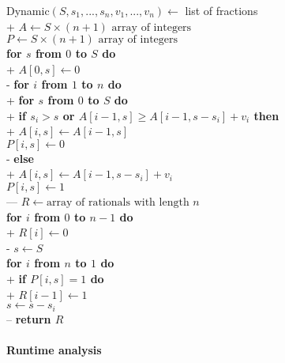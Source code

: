 \documentclass{article}
\begin{document}
\begin{pseudo}
    Dynamic$(S,s_1,...,s_n,v_1,...,v_n)\leftarrow$ list of fractions\\+
        $A\leftarrow S\times (n+1)\text{ array of integers}$\\
        $P\leftarrow S\times (n+1)\text{ array of integers}$\\
        \textbf{for $s$ from $0$ to $S$ do}\\+
            $A[0,s] \leftarrow 0$\\-
        \textbf{for $i$ from $1$ to $n$ do}\\+
            \textbf{for $s$ from $0$ to $S$ do}\\+
                \textbf{if $s_i>s$ or $A[i-1,s]\geq A[i-1,s-s_i] + v_i$ then}\\+
                    $A[i, s] \leftarrow A[i-1,s]$\\
                    $P[i, s] \leftarrow 0$\\- 
                \textbf{else}\\+
                    $A[i, s] \leftarrow A[i-1,s-s_i] + v_i$\\
                    $P[i, s] \leftarrow 1$\\---
        $R\leftarrow \text{array of rationals with length }n$\\
        \textbf{for $i$ from $0$ to $n-1$ do}\\+
            $R[i] \leftarrow 0$\\-
        $s\leftarrow S$\\
        \textbf{for $i$ from $n$ to $1$ do}\\+
            \textbf{if $P[i,s]=1$ do}\\+
                $R[i-1]\leftarrow 1$\\
                $s \leftarrow s - s_i$\\--
        \textbf{return $R$}
\end{pseudo}

\paragraph{Runtime analysis}
\end{document}
